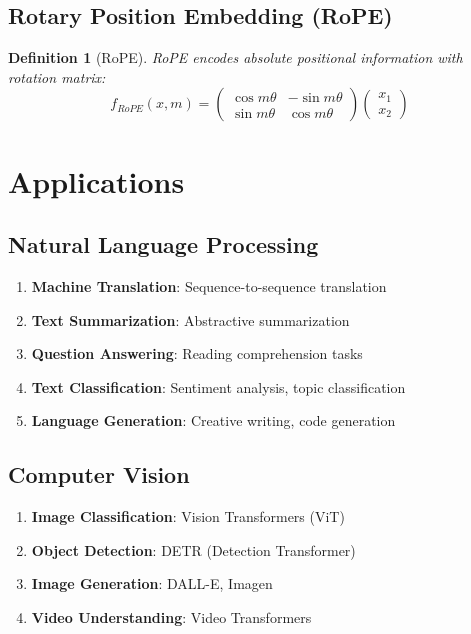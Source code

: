 \documentclass[11pt,a4paper]{article}
\newtheorem{definition}[theorem]{Definition}
\begin{document}
\subsection{Rotary Position Embedding (RoPE)}

\begin{definition}[RoPE]
RoPE encodes absolute positional information with rotation matrix:
$$f_{RoPE}(x, m) = \begin{pmatrix}
\cos m\theta & -\sin m\theta \\
\sin m\theta & \cos m\theta
\end{pmatrix} \begin{pmatrix}
x_1 \\
x_2
\end{pmatrix}$$
\end{definition}

\section{Applications}

\subsection{Natural Language Processing}

\begin{enumerate}
\item \textbf{Machine Translation}: Sequence-to-sequence translation
\item \textbf{Text Summarization}: Abstractive summarization
\item \textbf{Question Answering}: Reading comprehension tasks
\item \textbf{Text Classification}: Sentiment analysis, topic classification
\item \textbf{Language Generation}: Creative writing, code generation
\end{enumerate}

\subsection{Computer Vision}

\begin{enumerate}
\item \textbf{Image Classification}: Vision Transformers (ViT)
\item \textbf{Object Detection}: DETR (Detection Transformer)
\item \textbf{Image Generation}: DALL-E, Imagen
\item \textbf{Video Understanding}: Video Transformers
\end{enumerate}
\end{document}
